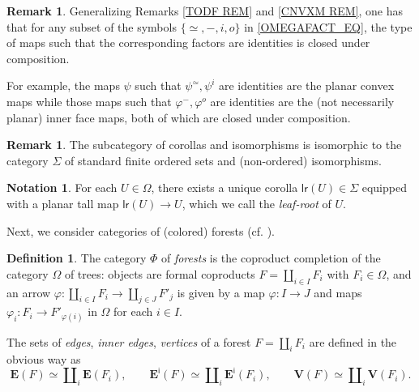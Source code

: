 \documentclass[a4paper,10pt
,draft
]{article}%
\numberwithin{equation}{section}
\numberwithin{figure}{section}
\theoremstyle{definition} %
\newtheorem{definition}[equation]{Definition}%
\newtheorem{remark}[equation]{Remark}%
\newtheorem{notation}[equation]{Notation}%
\newcommand{\1}{\ensuremath{\mathbbm 1}}%
\begin{document}
\begin{remark}
	Generalizing Remarks \ref{TODF REM} and \ref{CNVXM REM},
	one has that for any subset 
	of the symbols $\{\simeq,-,i,o\}$
	in \eqref{OMEGAFACT_EQ},
	the type of maps such that 
	the corresponding factors are identities 
	is closed under composition.
	
	For example, the maps $\psi$ such that 
	$\psi^{\simeq},\psi^{i}$
	are identities are the planar convex maps
	while those maps such that
	$\varphi^{-},\varphi^o$
	are identities are the (not necessarily planar) inner face maps,
	both of which are closed under composition.	
\end{remark}



\begin{remark}
      The subcategory of corollas and isomorphisms is isomorphic to the category $\Sigma$ of standard finite ordered sets and (non-ordered) isomorphisms.
\end{remark}


\begin{notation}
      \label{LR_NOT}
      For each $U \in \Omega$, there exists a unique corolla $\mathsf{lr}(U) \in \Sigma$ equipped with a planar tall map $\mathsf{lr}(U) \to U$,
      which we call the \textit{leaf-root} of $U$.
\end{notation}



Next, we consider categories of (colored) forests (cf. \cite[Defn. 2.56]{BP_HGOP}).

\begin{definition}
      The category $\Phi$ of \textit{forests} is the coproduct completion of the category $\Omega$ of trees:
      objects are formal coproducts 
      $F = \amalg_{i \in I} F_i$ with $F_i \in \Omega$,
      and an arrow 
      $\varphi \colon \amalg_{i \in I} F_i \to
      \amalg_{j \in J} F'_j$ is given by
      a map $\varphi \colon I \to J$ and
      maps $\varphi_i \colon F_i \to F'_{\varphi(i)}$ in $\Omega$ for each $i \in I$.

The sets of \emph{edges}, \emph{inner edges}, \emph{vertices}
of a forest $F = \amalg_i F_i$
are defined in the obvious way as
\[
	\boldsymbol{E}(F)
	\simeq
	\amalg_i \boldsymbol{E}(F_i),
\qquad
	\boldsymbol{E}^{\mathsf{i}}(F)
	\simeq
	\amalg_i \boldsymbol{E}^{\mathsf{i}}(F_i),
\qquad
	\boldsymbol{V}(F)
	\simeq
	\amalg_i \boldsymbol{V}(F_i).
\]
\end{definition}
\end{document}
